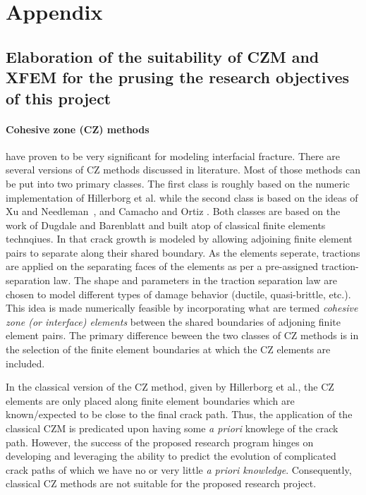 \documentclass[10pt,letterpaper]{article}
\begin{document}
\appendix
\section{Appendix}
\subsection{Elaboration of the  suitability of  CZM and XFEM  for the prusing the research objectives of this project}
\label{sec:CZM_XFEM_unsuitability}

    \paragraph{Cohesive zone (CZ) methods} have proven to be very significant for modeling interfacial fracture. There are several versions of CZ methods discussed in literature. Most of those methods can be put into two primary classes. The first class is roughly based on the numeric implementation of Hillerborg et al.\cite{hillerborg1976analysis}  while the second class is based on the ideas of Xu and Needleman~\cite{xu1994numerical}, and Camacho and Ortiz \cite{camacho1996computational}. Both classes are based on the work of Dugdale \cite{dugdale1960yielding} and Barenblatt \cite{barenblatt1962mathematical} and built atop of classical finite elements technqiues. In that crack growth is modeled by allowing adjoining finite  element pairs to separate along their shared boundary. As the elements seperate, tractions are applied on the separating faces of the elements as per a pre-assigned traction-separation law. The shape and parameters in the traction separation law are chosen to model different types of damage behavior (ductile, quasi-brittle, etc.). This idea is made numerically feasible by incorporating what are termed \textit{cohesive zone (or interface) elements} between the shared boundaries of adjoning finite element pairs. The primary difference beween the two classes of CZ methods is in the selection of the finite element boundaries at which the CZ elements are included.

    In the classical version of the CZ method, given by Hillerborg et al., the CZ elements are only placed along finite element boundaries which are known\slash expected to be close to the final crack path. Thus, the application of the classical CZM is  predicated upon having some \textit{a priori} knowlege of the crack path. However, the success of the proposed research program hinges on developing and leveraging the ability to predict the evolution of complicated crack paths of which we have no or very little \textit{a priori knowledge}. Consequently, classical CZ methods are not suitable for the proposed research project.%
\end{document}

